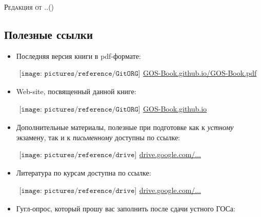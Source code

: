 {\LARGE\scshape Редакция от \twodigit\day.\twodigit\month.\the\year \;(\currenttime)}\par 

\vspace*{-1\baselineskip}  
\begin{flushleft}
\section*{\Large Полезные ссылки}
\begin{itemize}[wide, labelwidth=!, labelindent=0pt, label=$\blacktriangleright$, noitemsep]
\item Последняя версия книги в pdf-формате:

\qquad\href{https://GOS-Book.github.io/GOS-Book.pdf}{$
\begin{array}{l}
\texttt{[image: pictures/reference/GitORG]}
\end{array}
$\large GOS-Book.github.io/GOS-Book.pdf}

\item Web-site, посвященный данной книге:

\qquad\href{https://GOS-Book.github.io/}{$
\begin{array}{l}
\texttt{[image: pictures/reference/GitORG]}
\end{array}
$\large GOS-Book.github.io}

\item Дополнительные материалы, полезные при подготовке как к \textit{устному} экзамену, так и к \textit{письменному} доступны по ссылке:

\qquad\href{https://drive.google.com/drive/folders/0BzuzEyNkpwYDYjVNcE0wa3hqWjA?resourcekey=0-aTHs7f-3zgIwlKAK4rPJUA&usp=sharing}{$
\begin{array}{l}
\texttt{[image: pictures/reference/drive]}
\end{array}
$\large drive.google.com/...}

\item Литература по курсам доступна по ссылке:

\qquad\href{https://drive.google.com/drive/folders/0BzuzEyNkpwYDcENXcV9jNWdwVlU?resourcekey=0-lOEGThmzk8_YFjJ9_IUnPQ&usp=sharing}{$
\begin{array}{l}
\texttt{[image: pictures/reference/drive]}
\end{array}
$\large drive.google.com/...}

\item Гугл-опрос, который прошу вас заполнить после сдачи устного ГОСа:


\end{itemize}
\end{flushleft}

